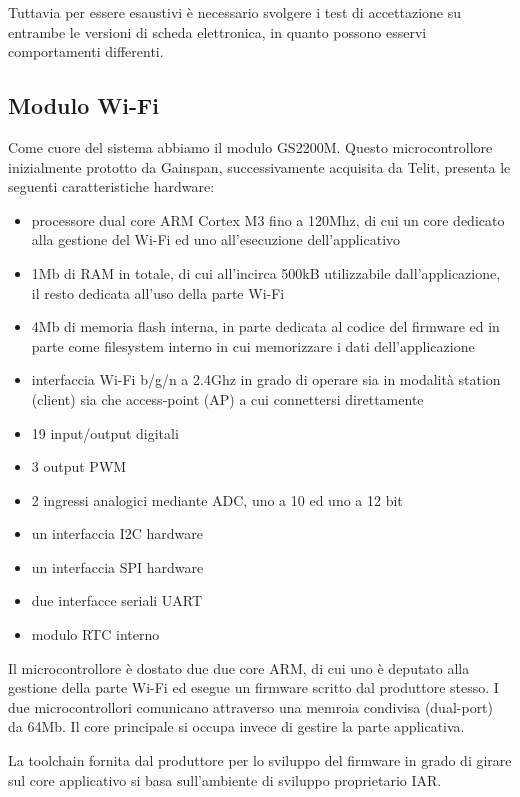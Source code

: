 \documentclass[12pt,a4paper,twoside,titlepage]{book}
\begin{document}
Tuttavia per essere esaustivi è necessario svolgere i test di accettazione su entrambe
le versioni di scheda elettronica, in quanto possono esservi comportamenti differenti.

\subsection{Modulo Wi-Fi}

Come cuore del sistema abbiamo il modulo GS2200M. Questo microcontrollore inizialmente
prototto da Gainspan, successivamente acquisita da Telit, presenta le seguenti
caratteristiche hardware:

\begin{itemize}
    \item processore dual core ARM Cortex M3 fino a 120Mhz, di cui un core dedicato
        alla gestione del Wi-Fi ed uno all'esecuzione dell'applicativo
    \item 1Mb di RAM in totale, di cui all'incirca 500kB utilizzabile dall’applicazione,
        il resto dedicata all'uso della parte Wi-Fi
    \item 4Mb di memoria flash interna, in parte dedicata al codice del firmware ed
        in parte come filesystem interno in cui memorizzare i dati dell'applicazione
    \item interfaccia Wi-Fi b/g/n a 2.4Ghz in grado di operare sia in modalità station
        (client) sia che access-point (AP) a cui connettersi direttamente
    \item 19 input/output digitali
    \item 3 output PWM
    \item 2 ingressi analogici mediante ADC, uno a 10 ed uno a 12 bit
    \item un interfaccia I2C hardware
    \item un interfaccia SPI hardware
    \item due interfacce seriali UART
    \item modulo RTC interno
\end{itemize}

Il microcontrollore è dostato due due core ARM, di cui uno è deputato alla gestione
della parte Wi-Fi ed esegue un firmware scritto dal produttore stesso. I due microcontrollori
comunicano attraverso una memroia condivisa (dual-port) da 64Mb. Il core principale
si occupa invece di gestire la parte applicativa.

La toolchain fornita dal produttore per lo sviluppo del firmware in grado di girare
sul core applicativo si basa sull'ambiente di sviluppo proprietario IAR.
\end{document}
